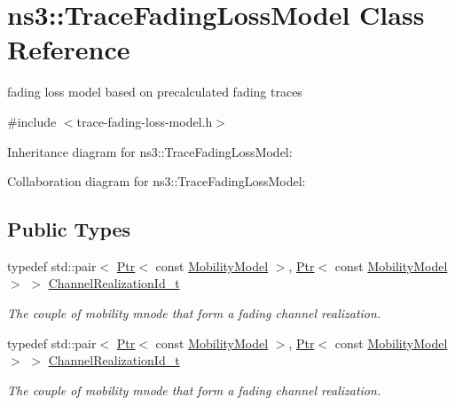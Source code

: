 \hypertarget{classns3_1_1TraceFadingLossModel}{}\section{ns3\+:\+:Trace\+Fading\+Loss\+Model Class Reference}
\label{classns3_1_1TraceFadingLossModel}


fading loss model based on precalculated fading traces  




{\ttfamily \#include $<$trace-\/fading-\/loss-\/model.\+h$>$}



Inheritance diagram for ns3\+:\+:Trace\+Fading\+Loss\+Model\+:


Collaboration diagram for ns3\+:\+:Trace\+Fading\+Loss\+Model\+:
\subsection*{Public Types}
\begin{DoxyCompactItemize}
\item 
typedef std\+::pair$<$ \hyperlink{classns3_1_1Ptr}{Ptr}$<$ const \hyperlink{classns3_1_1MobilityModel}{Mobility\+Model} $>$, \hyperlink{classns3_1_1Ptr}{Ptr}$<$ const \hyperlink{classns3_1_1MobilityModel}{Mobility\+Model} $>$ $>$ \hyperlink{classns3_1_1TraceFadingLossModel_a538fb5e148b837e46a2da767346839d4}{Channel\+Realization\+Id\+\_\+t}
\begin{DoxyCompactList}\small\item\em The couple of mobility mnode that form a fading channel realization. \end{DoxyCompactList}\item 
typedef std\+::pair$<$ \hyperlink{classns3_1_1Ptr}{Ptr}$<$ const \hyperlink{classns3_1_1MobilityModel}{Mobility\+Model} $>$, \hyperlink{classns3_1_1Ptr}{Ptr}$<$ const \hyperlink{classns3_1_1MobilityModel}{Mobility\+Model} $>$ $>$ \hyperlink{classns3_1_1TraceFadingLossModel_a538fb5e148b837e46a2da767346839d4}{Channel\+Realization\+Id\+\_\+t}
\begin{DoxyCompactList}\small\item\em The couple of mobility mnode that form a fading channel realization. \end{DoxyCompactList}\end{DoxyCompactItemize}
